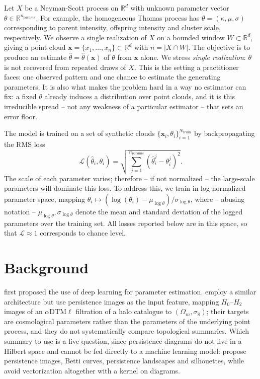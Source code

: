 \documentclass[11pt,a4paper]{article}
\newcommand{\R}{\mathbb{R}}
\newcommand{\pc}{\mathbf{x}}
\begin{document}
Let $X$ be a Neyman-Scott process on $\R^d$ with unknown parameter vector
$\theta \in \R^{n_{params}}$. For example, the homogeneous Thomas process has
$\theta = (\kappa, \mu, \sigma)$ corresponding to parent intensity, offspring
intensity and cluster scale, respectively. We observe a single realization of
$X$ on a bounded window $W \subset \R^d$, giving a point cloud
$\pc = \{x_1, \dots, x_n\} \subset \R^d$ with $n = |X \cap W|$. The objective is
to produce an estimate $\hat\theta = \hat\theta(\pc)$ of $\theta$ from $\pc$
alone. We stress \emph{single realization}: $\theta$ is not recovered from
repeated draws of $X$. This is the setting a practitioner faces: one observed
pattern and one chance to estimate the generating parameters. It is also what
makes the problem hard in a way no estimator can fix: a fixed $\theta$ already
induces a distribution over point clouds, and it is this irreducible spread --
not any weakness of a particular estimator -- that sets an error floor.

The model is trained on a set of synthetic clouds
$\{\pc_i, \theta_i\}_{i=1}^{N_{train}}$ by backpropagating the RMS loss
    \[
    \mathcal{L}(\hat\theta_i, \theta_i) = \sqrt{\sum_{j=1}^{n_{params}}(\hat\theta^j_i - \theta^j_i)^2}.
    \]
The scale of each parameter varies; therefore -- if not normalized -- the
large-scale parameters will dominate this loss. To address this, we train in
log-normalized parameter space, mapping
$\theta_i \mapsto (\log(\theta_i) - \mu_{\log\theta})/\sigma_{\log\theta}$,
where -- abusing notation -- $\mu_{\log\theta}, \sigma_{\log\theta}$ denote the
mean and standard deviation of the logged parameters over the training set. All
losses reported below are in this space, so that $\mathcal{L}\approx 1$
corresponds to chance level.

\section{Background}
\label{sec:background}

\citet{vihrs2022neural} first proposed the use of deep learning for parameter
estimation. \citet{yip2025learning} employ a similar architecture but use
persistence images as the input feature, mapping $H_0$--$H_2$ images of an
$\alpha\mathrm{DTM}\ell$ filtration of a halo catalogue to
$(\Omega_m,\sigma_8)$; their targets are cosmological parameters rather than the
parameters of the underlying point process, and they do not systematically
compare topological summaries. Which summary to use is a live question, since
persistence diagrams do not live in a Hilbert space and cannot be fed directly
to a machine learning model: \citet{adams2017persistence} propose persistence
images, \citet{umeda2017time} Betti curves, \citet{bubenik2015landscapes}
persistence landscapes and \citet{chazal2014silhouette} silhouettes, while
\citet{reininghaus2015kernel} avoid vectorization altogether with a kernel on
diagrams.
\end{document}
